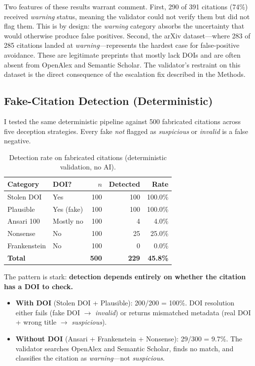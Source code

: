 Two features of these results warrant comment. First, 290 of 391 citations (74\%) received \textit{warning} status, meaning the validator could not verify them but did not flag them. This is by design: the \textit{warning} category absorbs the uncertainty that would otherwise produce false positives. Second, the arXiv dataset---where 283 of 285 citations landed at \textit{warning}---represents the hardest case for false-positive avoidance. These are legitimate preprints that mostly lack DOIs and are often absent from OpenAlex and Semantic Scholar. The validator's restraint on this dataset is the direct consequence of the escalation fix described in the Methods.

\subsection{Fake-Citation Detection (Deterministic)}

I tested the same deterministic pipeline against 500 fabricated citations across five deception strategies. Every fake \emph{not} flagged as \textit{suspicious} or \textit{invalid} is a false negative.

\begin{table}[H]
\centering
\caption{Detection rate on fabricated citations (deterministic validation, no AI).}
\label{tab:detection}
\begin{tabular}{@{}llrrr@{}}
\toprule
\textbf{Category} & \textbf{DOI?} & \textbf{$n$} & \textbf{Detected} & \textbf{Rate} \\
\midrule
Stolen DOI    & Yes         & 100 & 100 & 100.0\% \\
Plausible     & Yes (fake)  & 100 & 100 & 100.0\% \\
Ansari 100    & Mostly no   & 100 &   4 &   4.0\% \\
Nonsense      & No          & 100 &  25 &  25.0\% \\
Frankenstein  & No          & 100 &   0 &   0.0\% \\
\midrule
\textbf{Total} &            & \textbf{500} & \textbf{229} & \textbf{45.8\%} \\
\bottomrule
\end{tabular}
\end{table}

The pattern is stark: \textbf{detection depends entirely on whether the citation has a DOI to check.}

\begin{itemize}
  \item \textbf{With DOI} (Stolen DOI + Plausible): 200/200 = 100\%. DOI resolution either fails (fake DOI $\to$ \textit{invalid}) or returns mismatched metadata (real DOI + wrong title $\to$ \textit{suspicious}).
  \item \textbf{Without DOI} (Ansari + Frankenstein + Nonsense): 29/300 = 9.7\%. The validator searches OpenAlex and Semantic Scholar, finds no match, and classifies the citation as \textit{warning}---not \textit{suspicious}.
\end{itemize}

